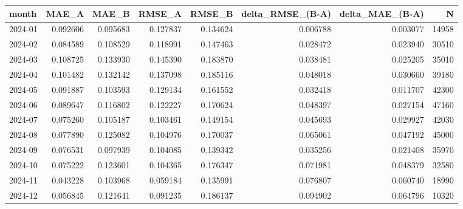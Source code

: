 \begin{tabular}{lrrrrrrr}
\toprule
month & MAE_A & MAE_B & RMSE_A & RMSE_B & delta_RMSE_(B-A) & delta_MAE_(B-A) & N \\
\midrule
2024-01 & 0.092606 & 0.095683 & 0.127837 & 0.134624 & 0.006788 & 0.003077 & 14958 \\
2024-02 & 0.084589 & 0.108529 & 0.118991 & 0.147463 & 0.028472 & 0.023940 & 30510 \\
2024-03 & 0.108725 & 0.133930 & 0.145390 & 0.183870 & 0.038481 & 0.025205 & 35010 \\
2024-04 & 0.101482 & 0.132142 & 0.137098 & 0.185116 & 0.048018 & 0.030660 & 39180 \\
2024-05 & 0.091887 & 0.103593 & 0.129134 & 0.161552 & 0.032418 & 0.011707 & 42300 \\
2024-06 & 0.089647 & 0.116802 & 0.122227 & 0.170624 & 0.048397 & 0.027154 & 47160 \\
2024-07 & 0.075260 & 0.105187 & 0.103461 & 0.149154 & 0.045693 & 0.029927 & 42030 \\
2024-08 & 0.077890 & 0.125082 & 0.104976 & 0.170037 & 0.065061 & 0.047192 & 45000 \\
2024-09 & 0.076531 & 0.097939 & 0.104085 & 0.139342 & 0.035256 & 0.021408 & 35970 \\
2024-10 & 0.075222 & 0.123601 & 0.104365 & 0.176347 & 0.071981 & 0.048379 & 32580 \\
2024-11 & 0.043228 & 0.103968 & 0.059184 & 0.135991 & 0.076807 & 0.060740 & 18990 \\
2024-12 & 0.056845 & 0.121641 & 0.091235 & 0.186137 & 0.094902 & 0.064796 & 10320 \\
\bottomrule
\end{tabular}
